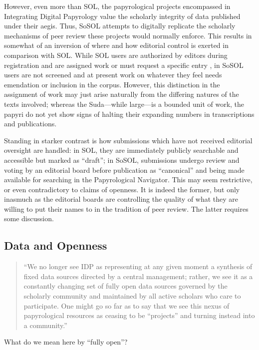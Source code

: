 \documentclass[]{article}
\begin{document}
However, even more than SOL, the papyrological projects encompassed in Integrating Digital Papyrology value the scholarly integrity of data published under their aegis. Thus, SoSOL attempts to digitally replicate the scholarly mechanisms of peer review these projects would normally enforce. This results in somewhat of an inversion of where and how editorial control is exerted in comparison with SOL. While SOL users are authorized by editors during registration and are assigned work or must request a specific entry \citep{mahoney}, in SoSOL users are not screened and at present work on whatever they feel needs emendation or inclusion in the corpus. However, this distinction in the assignment of work may just arise naturally from the differing natures of the texts involved; whereas the Suda—while large—is a bounded unit of work, the papyri do not yet show signs of halting their expanding numbers in transcriptions and publications.

Standing in starker contrast is how submissions which have not received editorial oversight are handled: in SOL, they are immediately publicly searchable and accessible but marked as “draft”; in SoSOL, submissions undergo review and voting by an editorial board before publication as “canonical” and being made available for searching in the Papyrological Navigator. This may seem restrictive, or even contradictory to claims of openness. It is indeed the former, but only inasmuch as the editorial boards are controlling the quality of what they are willing to put their names to in the tradition of peer review. The latter requires some discussion.

\subsection*{Data and Openness}

\begin{quote}
“We no longer see IDP as representing at any given moment a synthesis of fixed data sources directed by a central management; rather, we see it as a constantly changing set of fully open data sources governed by the scholarly community and maintained by all active scholars who care to participate. One might go so far as to say that we see this nexus of papyrological resources as ceasing to be “projects” and turning instead into a community.”
\end{quote}

What do we mean here by “fully open”?
\end{document}
